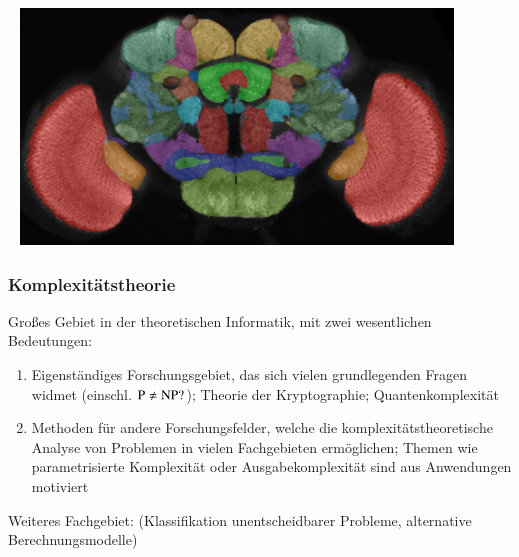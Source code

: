 \documentclass[onlymath]{beamer}
\begin{document}
\begin{frame}\frametitle{}

~\hspace{-1cm}
\includegraphics[width=11.5cm]{images/fly-brain}

\end{frame}

\begin{frame}\frametitle{Komplexitätstheorie}

Großes Gebiet in der theoretischen Informatik, mit zwei wesentlichen Bedeutungen:

\begin{enumerate}[1]
\item \alert{Eigenständiges Forschungsgebiet}, das sich vielen grundlegenden Fragen widmet (einschl. ${\textsc{P}}\neq{\textsc{NP}}?$); Theorie der Kryptographie; Quantenkomplexität
% 
\item \alert{Methoden für andere Forschungsfelder}, welche die komplexitätstheoretische Analyse von Problemen
in vielen Fachgebieten ermöglichen; Themen wie parametrisierte Komplexität oder Ausgabekomplexität sind aus
Anwendungen motiviert
\end{enumerate}

Weiteres Fachgebiet:  (Klassifikation unentscheidbarer Probleme, alternative Berechnungsmodelle)

\end{frame}

% 
%
\end{document}
